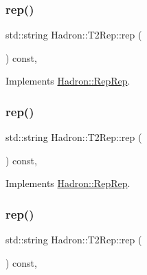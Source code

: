 \subsubsection{\texorpdfstring{rep()}{rep()}\hspace{0.1cm}{\footnotesize\ttfamily [1/5]}}
{\footnotesize\ttfamily std\+::string Hadron\+::\+T2\+Rep\+::rep (\begin{DoxyParamCaption}{ }\end{DoxyParamCaption}) const\hspace{0.3cm}{\ttfamily [inline]}, {\ttfamily [virtual]}}



Implements \mbox{\hyperlink{structHadron_1_1RepRep_ab3213025f6de249f7095892109575fde}{Hadron\+::\+Rep\+Rep}}.

\mbox{\label{structHadron_1_1T2Rep_aa8debf402fc347d71fe8ba6745578c0d}} 
\subsubsection{\texorpdfstring{rep()}{rep()}\hspace{0.1cm}{\footnotesize\ttfamily [2/5]}}
{\footnotesize\ttfamily std\+::string Hadron\+::\+T2\+Rep\+::rep (\begin{DoxyParamCaption}{ }\end{DoxyParamCaption}) const\hspace{0.3cm}{\ttfamily [inline]}, {\ttfamily [virtual]}}



Implements \mbox{\hyperlink{structHadron_1_1RepRep_ab3213025f6de249f7095892109575fde}{Hadron\+::\+Rep\+Rep}}.

\mbox{\label{structHadron_1_1T2Rep_aa8debf402fc347d71fe8ba6745578c0d}} 
\subsubsection{\texorpdfstring{rep()}{rep()}\hspace{0.1cm}{\footnotesize\ttfamily [3/5]}}
{\footnotesize\ttfamily std\+::string Hadron\+::\+T2\+Rep\+::rep (\begin{DoxyParamCaption}{ }\end{DoxyParamCaption}) const\hspace{0.3cm}{\ttfamily [inline]}, {\ttfamily [virtual]}}



